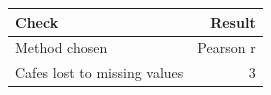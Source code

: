 \begin{tabular}{lr}
\toprule
Check & Result \\
\midrule
Method chosen & Pearson r \\
Cafes lost to missing values & 3 \\
\bottomrule
\end{tabular}

